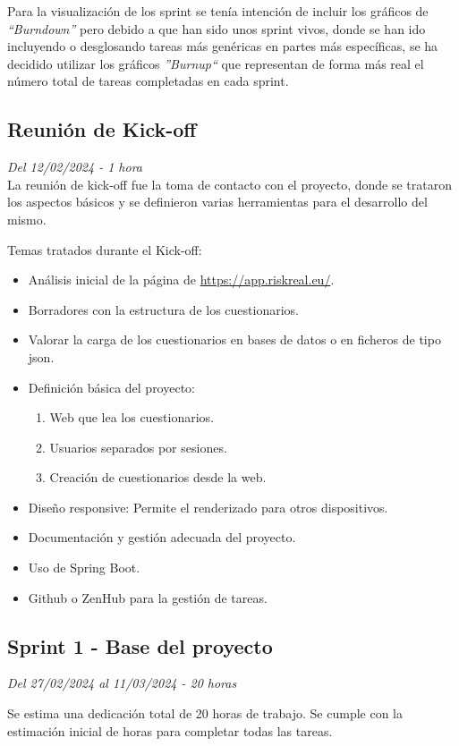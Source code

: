 Para la visualización de los sprint se tenía intención de incluir los gráficos de \textit{``Burndown''} pero debido a que han sido unos sprint vivos, donde se han ido incluyendo o desglosando tareas más genéricas en partes más específicas, se ha decidido utilizar los gráficos \textit{''Burnup``} que representan de forma más real el número total de tareas completadas en cada sprint.

\subsection{Reunión de Kick-off}
\textit{Del 12/02/2024 - 1 hora}\\

La reunión de kick-off fue la toma de contacto con el proyecto, donde se trataron los aspectos básicos y se definieron varias herramientas para el desarrollo del mismo.

Temas tratados durante el Kick-off:
\begin{itemize}
	\item
	Análisis inicial de la página de \url{https://app.riskreal.eu/}.
	\item
	Borradores con la estructura de los cuestionarios.
	\item
	Valorar la carga de los cuestionarios en bases de datos o en ficheros de tipo json.
	\item
	Definición básica del proyecto:
	\begin{enumerate}
		\item
		Web que lea los cuestionarios.
		\item
		Usuarios separados por sesiones.
		\item
		Creación de cuestionarios desde la web.
	\end{enumerate}
	\item
	Diseño responsive: Permite el renderizado para otros dispositivos.
	\item
	Documentación y gestión adecuada del proyecto.
	\item
	Uso de Spring Boot.
	\item
	Github o ZenHub para la gestión de tareas.
\end{itemize}


\subsection{Sprint 1 - Base del proyecto}
\textit{Del 27/02/2024 al 11/03/2024 - 20 horas}

Se estima una dedicación total de 20 horas de trabajo.
Se cumple con la estimación inicial de horas para completar todas las tareas.

